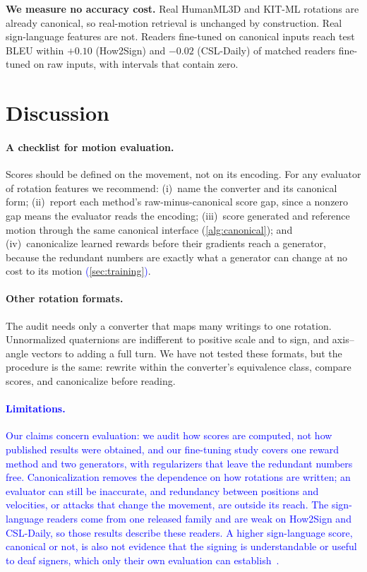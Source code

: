 \documentclass[10pt,twocolumn,letterpaper]{article}
\newcommand{\new}[1]{\textcolor{blue}{#1}}%
\begin{document}
\textbf{We measure no accuracy cost.} Real HumanML3D and KIT-ML rotations are already canonical, so real-motion retrieval is unchanged by construction. Real sign-language features are not. Readers fine-tuned on canonical inputs reach test BLEU within $+0.10$ (How2Sign) and $-0.02$ (CSL-Daily) of matched readers fine-tuned on raw inputs, with intervals that contain zero.

\section{Discussion}
\paragraph{A checklist for motion evaluation.} Scores should be defined on the movement, not on its encoding. For any evaluator of rotation features we recommend: (i)~name the converter and its canonical form; (ii)~report each method's raw-minus-canonical score gap, since a nonzero gap means the evaluator reads the encoding; (iii)~score generated and reference motion through the same canonical interface (\cref{alg:canonical}); and (iv)~canonicalize learned rewards before their gradients reach a generator, because the redundant numbers are exactly what a generator can change at no cost to its motion \new{(\cref{sec:training})}.

\paragraph{Other rotation formats.}
The audit needs only a converter that maps many writings to one rotation. Unnormalized quaternions are indifferent to positive scale and to sign, and axis--angle vectors to adding a full turn. We have not tested these formats, but the procedure is the same: rewrite within the converter's equivalence class, compare scores, and canonicalize before reading.

\paragraph{\new{Limitations.}}
\new{Our claims concern evaluation: we audit how scores are computed, not how published results were obtained, and our fine-tuning study covers one reward method and two generators, with regularizers that leave the redundant numbers free. Canonicalization removes the dependence on how rotations are written; an evaluator can still be inaccurate, and redundancy between positions and velocities, or attacks that change the movement, are outside its reach. The sign-language readers come from one released family and are weak on How2Sign and CSL-Daily, so those results describe these readers. A higher sign-language score, canonical or not, is also not evidence that the signing is understandable or useful to deaf signers, which only their own evaluation can establish~\cite{jiang2025,angelini2025}.}
\end{document}

